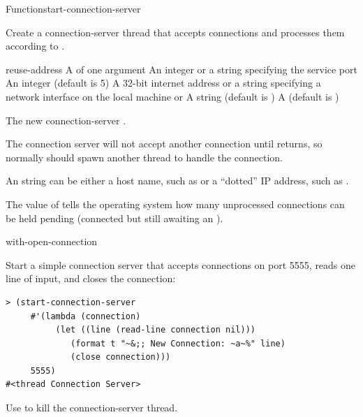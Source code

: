 \documentclass[10pt,twoside,english,pdftex]{article}
\begin{document}
\begin{functiondoc}{Function}{start-connection-server}%
  {  
   \returns{} }
%
%
%
%

\fnsyntax

\fnpurpose Create a connection-server thread that accepts connections
and processes them according to .

\fnpackage {}

\fnmodule {}

\fnargs
\begin{args}{reuse-address}
\arg[function] A  of one argument
\arg[port] An integer or a string specifying the service port
\arg[backlog] An integer (default is 5)
\arg[interface] A 32-bit internet address or a string specifying a network 
interface on the local machine or \nil 
\arg[name] A string (default is )
 A  (default is \nil)
\end{args}

\fnreturns The new connection-server .

\fnerrors
\nothreads{}

%
\fndescription The connection server will not accept another
connection until  returns, so normally
 should spawn another thread to handle the
connection.  

An  string can be either a host name, such as
 or a ``dotted'' IP address, such as .

The value of  tells the operating system
how many unprocessed connections can be held pending (connected but
still awaiting an \textbf{}).

\begin{alsos}{with-open-connection}
\end{alsos}

\fnexample
Start a simple connection server that accepts connections on port
5555, reads one line of input, and closes the connection:
\begin{verbatim}
> (start-connection-server
     #'(lambda (connection)
          (let ((line (read-line connection nil)))
             (format t "~&;; New Connection: ~a~%" line)
             (close connection)))
     5555)
#<thread Connection Server>
\end{verbatim}

%
\fnnote
Use \textbf{} to kill the connection-server thread.

\end{functiondoc}
\end{document}
